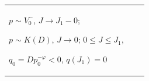 \begin{center}
\begin{tabular}{|l|c|c|}
\parbox{6.5cm}{$p\sim V^-_0$, $J\to J_1-0$; 


$p\sim K(D)$, $J\to0$; $0\le J\le J_1$, 


$q_0=D p^{-\varphi}_0<0$, $q(J_1)=0$}\\ 


\hline 


$\mu>\mu_2$ & 


\parbox{6.5cm}{$p\sim (d_3p_1\sigma^{-1})^\lambda$, 


$J\to J_0-0$; $p\sim K(\wt D)$, $J\to0$; 


$0\le J\le J_0$, $q_0=\wt D p^{-\varphi}_0<0$, 


$q(J_0)=-\infty$} & 


\parbox{6.5cm}{$p\sim T^-_0(d_2)$, $J\to J_1-0$; 


$p\sim K(D)$, $J\to0$; $0\le J\le J_1$, 


$q_0=D p^{-\varphi}_0<0$, $q(J_1)=0$}\\ 


\hline 


\ &  \\ 


\hline 


$-\infty<\mu<\infty$ & 


\\ 


\hline 


\end{tabular} 


\end{center} 










 


